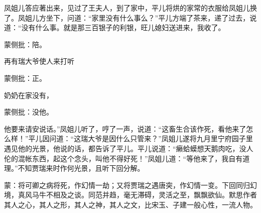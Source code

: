 \begin{parag}
    凤姐儿答应著出来，见过了王夫人，到了家中，平儿将烘的家常的衣服给凤姐儿换了。凤姐儿方坐下，问道：“家里没有什么事么？”平儿方端了茶来，递了过去，说道：“没有什么事。就是那三百银子的利银，旺儿媳妇送进来，我收了。\begin{note}蒙侧批：陪。\end{note}再有瑞大爷使人来打听\begin{note}蒙侧批：正。\end{note}奶奶在家没有，\begin{note}蒙侧批：没他。\end{note}他要来请安说话。”凤姐儿听了，哼了一声，说道：“这畜生合该作死，看他来了怎么样！”平儿因问道：“这瑞大爷是因什么只管来？”凤姐儿遂将九月里宁府园子里遇见他的光景，他说的话，都告诉了平儿。平儿说道：“癞蛤蟆想天鹅肉吃，没人伦的混帐东西，起这个念头，叫他不得好死！”凤姐儿道：“等他来了，我自有道理。”不知贾瑞来时作何光景，且听下回分解。
\end{parag}


\begin{parag}
    \begin{note}蒙：将可卿之病将死，作幻情一劫；又将贾瑞之遇唐突，作幻情一变。下回同归幻境，真风马牛不相及之谈。同范并趋，毫无滞碍，灵活之至，飘飘欲仙。默思作者其人之心，其人之形，其人之神，其人之文，比宋玉、子建一般心性，一流人物。\end{note}
\end{parag}
